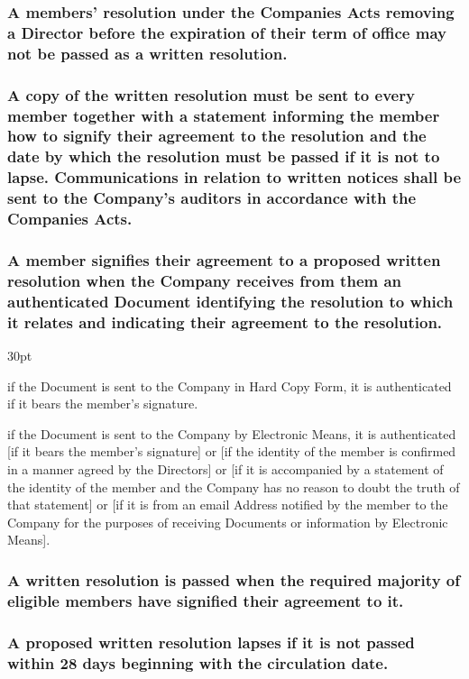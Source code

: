 \documentclass[12pt]{article}
\def\clauseindent{30pt}
\newenvironment{subindentpara}{\begin{adjustwidth}{\clauseindent}{}\begin{hanginglist}}{\end{hanginglist}\end{adjustwidth}}
\begin{document}
\subsubsection[Directors may not be removed by Written Resolution]{\label{subsubsection:reswrexc}A members' resolution under the Companies Acts removing a Director before the expiration of their term of office may not be passed as a written resolution.}
\subsubsection{A copy of the written resolution must be sent to every member together with a statement informing the member how to signify their agreement to the resolution and the date by which the resolution must be passed if it is not to lapse. Communications in relation to written notices shall be sent to the Company's auditors in accordance with the Companies Acts.}
\subsubsection{A member signifies their agreement to a proposed written resolution when the Company receives from them an authenticated Document identifying the resolution to which it relates and indicating their agreement to the resolution.}
\begin{subindentpara}
    \item if the Document is sent to the Company in Hard Copy Form, it is authenticated if it bears the member's signature.
    \item if the Document is sent to the Company by Electronic Means, it is authenticated [if it bears the member's signature] or [if the identity of the member is confirmed in a manner agreed by the Directors] or [if it is accompanied by a statement of the identity of the member and the Company has no reason to doubt the truth of that statement] or [if it is from an email Address notified by the member to the Company for the purposes of receiving Documents or information by Electronic Means].
\end{subindentpara}
\subsubsection{A written resolution is passed when the required majority of eligible members have signified their agreement to it.}
\subsubsection{A proposed written resolution lapses if it is not passed within 28 days beginning with the circulation date.}
\end{document}
